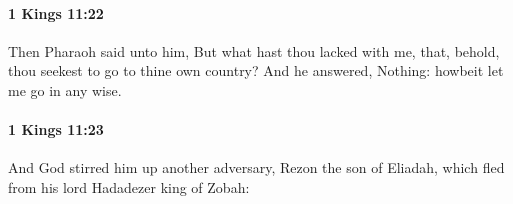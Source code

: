 		\paragraph{1 Kings 11:22} %
			\label{1KINGS-11-22}

			Then Pharaoh said unto him, But what hast thou lacked with me, that, behold, thou seekest to go to thine own country? And he answered, Nothing: howbeit let me go in any wise.


		\paragraph{1 Kings 11:23} %
			\label{1KINGS-11-23}

			And God stirred him up another adversary, Rezon the son of Eliadah, which fled from his lord Hadadezer king of Zobah:


